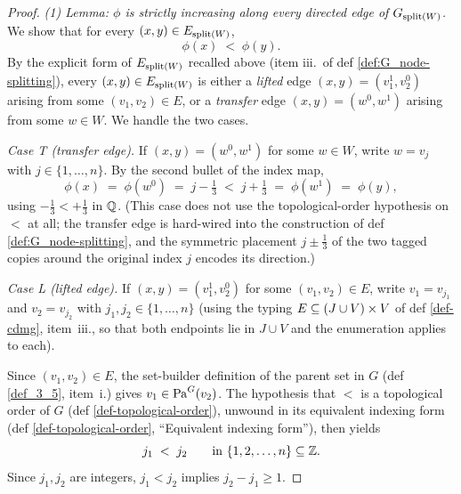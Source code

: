 \documentclass[main]{subfiles}
\begin{document}
\begin{proof}
\medskip\noindent\emph{(1) Lemma: $\phi$ is strictly increasing along every directed edge of $G_{\mathrm{split}(W)}$.}
We show that for every $(x, y) \in E_{\mathrm{split}(W)}$,
\[
    \phi(x) \;<\; \phi(y).
\]
By the explicit form of $E_{\mathrm{split}(W)}$ recalled above (item iii.\ of def \ref{def:G_node-splitting}), every $(x, y) \in E_{\mathrm{split}(W)}$ is either a \emph{lifted} edge $(x, y) = (v_1^1, v_2^0)$ arising from some $(v_1, v_2) \in E$, or a \emph{transfer} edge $(x, y) = (w^0, w^1)$ arising from some $w \in W$. We handle the two cases.

\emph{Case T (transfer edge).} If $(x, y) = (w^0, w^1)$ for some $w \in W$, write $w = v_j$ with $j \in \{1, \dots, n\}$. By the second bullet of the index map,
\[
    \phi(x) \;=\; \phi(w^0) \;=\; j - \tfrac{1}{3} \;<\; j + \tfrac{1}{3} \;=\; \phi(w^1) \;=\; \phi(y),
\]
using $-\tfrac{1}{3} < +\tfrac{1}{3}$ in $\mathbb{Q}$. (This case does not use the topological-order hypothesis on $<$ at all; the transfer edge is hard-wired into the construction of def \ref{def:G_node-splitting}, and the symmetric placement $j \pm \tfrac{1}{3}$ of the two tagged copies around the original index $j$ encodes its direction.)

\emph{Case L (lifted edge).} If $(x, y) = (v_1^1, v_2^0)$ for some $(v_1, v_2) \in E$, write $v_1 = v_{j_1}$ and $v_2 = v_{j_2}$ with $j_1, j_2 \in \{1, \dots, n\}$ (using the typing $E \subseteq (J \cup V) \times V$ of def \ref{def-cdmg}, item~iii., so that both endpoints lie in $J \cup V$ and the enumeration applies to each).

Since $(v_1, v_2) \in E$, the set-builder definition of the parent set in $G$ (def \ref{def_3_5}, item~i.) gives $v_1 \in \mathrm{Pa}^G(v_2)$. The hypothesis that $<$ is a topological order of $G$ (def \ref{def-topological-order}), unwound in its equivalent indexing form (def \ref{def-topological-order}, ``Equivalent indexing form''), then yields
\[
    j_1 \;<\; j_2 \qquad \text{in } \{1, 2, \dots, n\} \subseteq \mathbb{Z}.
\]
Since $j_1, j_2$ are integers, $j_1 < j_2$ implies $j_2 - j_1 \ge 1$.


\end{proof}
\end{document}
